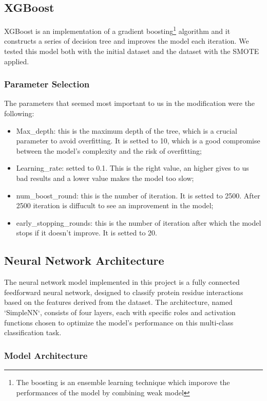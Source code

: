 \documentclass[10pt,twocolumn,letterpaper]{article}
\begin{document}
\subsection{XGBoost}
XGBoost is an implementation of a gradient boosting\footnote{The boosting is an ensemble learning technique which 
imporove the performances of the model by combining weak model} algorithm and it constructs a series of decision
tree and improves the model each iteration. We tested this model both with the initial dataset and the dataset with the 
SMOTE applied.
\subsubsection{Parameter Selection}
The parameters that seemed most important to us in the modification were the following:
\begin{itemize}
    \item Max\_depth: this is the maximum depth of the tree, which is a crucial parameter to avoid overfitting. 
    It is setted to 10, which is a good compromise between the model's complexity and the risk of overfitting;
    \item Learning\_rate: setted to 0.1. This is the right value, an higher gives to us bad results and a lower 
    value makes the model too slow;
    \item num\_boost\_round: this is the number of iteration. It is setted to 2500. After 2500 iteration 
    is diffucult to see an improvement in the model;
    \item early\_stopping\_rounds: this is the number of iteration after which the model stops if it doesn't 
    improve. It is setted to 20.
\end{itemize}

\subsection{Neural Network Architecture}

The neural network model implemented in this project is a fully connected feedforward neural network, designed to classify protein residue interactions based on the features derived from the dataset. The architecture, named `SimpleNN`, consists of four layers, each with specific roles and activation functions chosen to optimize the model's performance on this multi-class classification task.

\subsubsection{Model Architecture}
\end{document}
